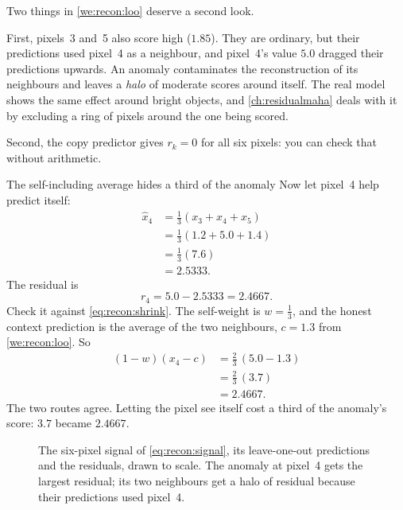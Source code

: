 Two things in \cref{we:recon:loo} deserve a second look.

First, pixels~3 and~5 also score high ($1.85$). They are ordinary, but their predictions used pixel~4
as a neighbour, and pixel~4's value $5.0$ dragged their predictions upwards. An anomaly contaminates
the reconstruction of its neighbours and leaves a \emph{halo} of moderate scores around
itself. The real model shows the same effect around bright objects, and \cref{ch:residualmaha}
deals with it by excluding a ring of pixels around the one being scored.

Second, the copy predictor gives $r_k = 0$ for all six pixels: you can check that without arithmetic.

\begin{worked}[label={we:recon:self}]{The self-including average hides a third of the anomaly}
Now let pixel~4 help predict itself:
\begin{align*}
\hat{x}_4 &= \tfrac13(x_3 + x_4 + x_5)\\
 &= \tfrac13(1.2 + 5.0 + 1.4)\\
 &= \tfrac13(7.6)\\
 &= 2.5333.
\end{align*}
The residual is
\[
r_4 = 5.0 - 2.5333 = 2.4667.
\]
Check it against \cref{eq:recon:shrink}. The self-weight is $w=\tfrac13$, and the honest context
prediction is the average of the two neighbours, $c = 1.3$ from \cref{we:recon:loo}. So
\begin{align*}
(1-w)(x_4 - c) &= \tfrac23\,(5.0 - 1.3)\\
&= \tfrac23\,(3.7)\\
&= 2.4667.
\end{align*}
The two routes agree. Letting the pixel see itself cost a third of the anomaly's score: $3.7$ became
$2.4667$.
\end{worked}

\begin{figure}[htbp]\centering
{}
\caption{The six-pixel signal of \cref{eq:recon:signal}, its leave-one-out predictions and the
residuals, drawn to scale. The anomaly at pixel~4 gets the largest residual; its two neighbours get a
halo of residual because their predictions used pixel~4.}
\label{fig:recon:oned}
\end{figure}

